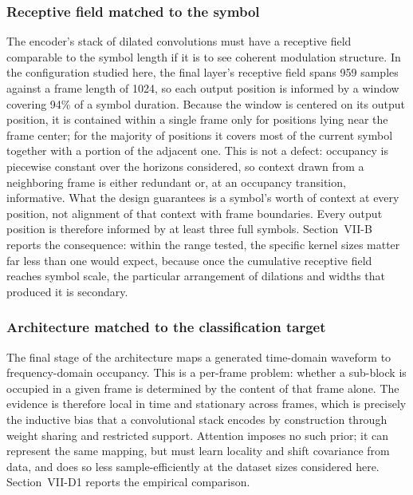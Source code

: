 \documentclass[lettersize,journal]{IEEEtran}
\begin{document}
\subsubsection{\textbf{Receptive field matched to the symbol}}
\label{sec:receptive}
The encoder's stack of dilated convolutions must have a receptive field
comparable to the symbol length if it is to see coherent modulation structure.
In the configuration studied here, the final layer's receptive field spans 959
samples against a frame length of 1024, so each output position is informed by a
window covering 94\% of a symbol duration. Because the window is centered on its
output position, it is contained within a single frame only for positions lying
near the frame center; for the majority of positions it covers most of the
current symbol together with a portion of the adjacent one. This is not a
defect: occupancy is piecewise constant over the horizons considered, so
context drawn from a neighboring frame is either redundant or, at an occupancy
transition, informative. What the design guarantees is a symbol's worth of
context at every position, not alignment of that context with frame boundaries.
Every output position is therefore informed by at least three full symbols.
Section~VII-B reports the consequence: within the range
tested, the specific kernel sizes matter far less than one would expect, because
once the cumulative receptive field reaches symbol scale, the particular
arrangement of dilations and widths that produced it is secondary.

\subsubsection{\textbf{Architecture matched to the classification target}}
\label{sec:ablation_head}
The final stage of the architecture maps a generated time-domain waveform to
frequency-domain occupancy. This is a per-frame problem: whether a sub-block is
occupied in a given frame is determined by the content of that frame alone. The
evidence is therefore local in time and stationary across frames, which is
precisely the inductive bias that a convolutional stack encodes by construction
through weight sharing and restricted support. Attention imposes no such prior;
it can represent the same mapping, but must learn locality and shift covariance
from data, and does so less sample-efficiently at the dataset sizes considered
here. Section~VII-D1 reports the empirical comparison.
\end{document}
